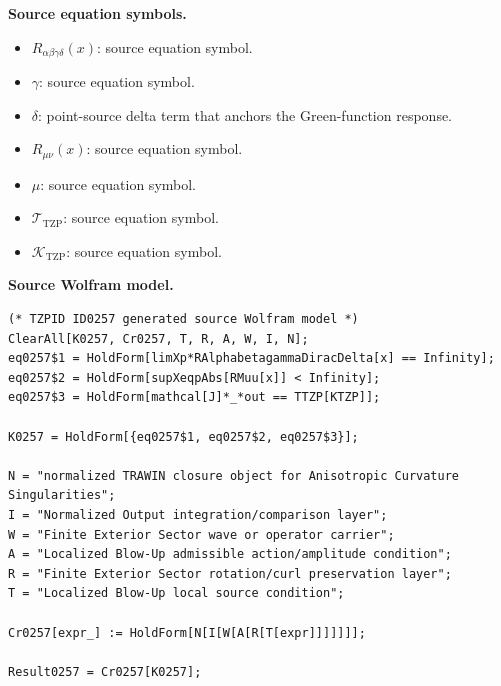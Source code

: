 \begin{minipage}[t]{0.49\linewidth}
\begingroup
\small
\raggedright
\textbf{Source equation symbols.}\par
\begin{itemize}[leftmargin=1.35em,itemsep=1pt,topsep=1pt,parsep=0pt]
    \item $R_{\alpha\beta\gamma\delta}(x)$: source equation symbol.
    \item $\gamma$: source equation symbol.
    \item $\delta$: point-source delta term that anchors the Green-function response.
    \item $R_{\mu\nu}(x)$: source equation symbol.
    \item $\mu$: source equation symbol.
    \item $\mathcal{T}_{\mathrm{TZP}}$: source equation symbol.
    \item $\mathcal{K}_{\mathrm{TZP}}$: source equation symbol.
\end{itemize}
\endgroup
\end{minipage}\hfill
\begin{minipage}[t]{0.47\linewidth}
\begingroup
\scriptsize
\raggedright
\textbf{Source Wolfram model.}\par
\begin{Verbatim}[fontsize=\tiny,breaklines=true,breakanywhere=true]
(* TZPID ID0257 generated source Wolfram model *)
ClearAll[K0257, Cr0257, T, R, A, W, I, N];
eq0257$1 = HoldForm[limXp*RAlphabetagammaDiracDelta[x] == Infinity];
eq0257$2 = HoldForm[supXeqpAbs[RMuu[x]] < Infinity];
eq0257$3 = HoldForm[mathcal[J]*_*out == TTZP[KTZP]];

K0257 = HoldForm[{eq0257$1, eq0257$2, eq0257$3}];

N = "normalized TRAWIN closure object for Anisotropic Curvature Singularities";
I = "Normalized Output integration/comparison layer";
W = "Finite Exterior Sector wave or operator carrier";
A = "Localized Blow-Up admissible action/amplitude condition";
R = "Finite Exterior Sector rotation/curl preservation layer";
T = "Localized Blow-Up local source condition";

Cr0257[expr_] := HoldForm[N[I[W[A[R[T[expr]]]]]]];

Result0257 = Cr0257[K0257];
\end{Verbatim}
\endgroup
\end{minipage}


